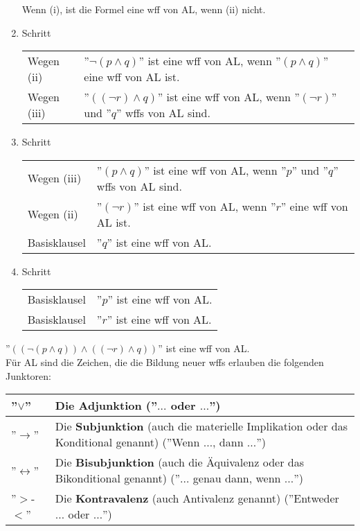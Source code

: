 \documentclass{scrartcl}
\begin{document}
\begin{enumerate}
	Wenn (i), ist die Formel eine wff von AL, wenn (ii) nicht.
	\item Schritt \\
	\begin{tabularx}{\linewidth}{l X}
		Wegen (ii) & ''$ \neg (p \wedge q) $'' ist eine wff von AL, wenn ''$ (p \wedge q) $'' eine wff von AL ist. \\
		Wegen (iii) & ''$ ((\neg r) \wedge q) $'' ist eine wff von AL, wenn ''$ (\neg r) $'' und ''$ q $'' wffs von AL sind.
	\end{tabularx}
	\item Schritt \\
	\begin{tabularx}{\linewidth}{l X}
		Wegen (iii) & ''$ (p \wedge q) $'' ist eine wff von AL, wenn ''$ p $'' und ''$ q $'' wffs von AL sind. \\
		Wegen (ii) & ''$ (\neg r) $'' ist eine wff von AL, wenn ''$ r $'' eine wff von AL ist. \\
		Basisklausel & ''$ q $'' ist eine wff von AL.
	\end{tabularx}
	\item Schritt \\
	\begin{tabularx}{\linewidth}{l X}
		Basisklausel & ''$ p $'' ist eine wff von AL. \\
		Basisklausel & ''$ r $'' ist eine wff von AL.
	\end{tabularx}
\end{enumerate}

''$ ((\neg (p \wedge q)) \wedge ((\neg r) \wedge q)) $'' ist eine wff von AL. \\

Für AL sind die Zeichen, die die Bildung neuer wffs erlauben die folgenden Junktoren: \\

\begin{tabularx}{\linewidth}{l X}
	''$ \vee $'' & Die \textbf{Adjunktion} (''$ \ldots $ oder $ \ldots $'') \\
	\hline
	''$ \rightarrow $'' & Die \textbf{Subjunktion} (auch die materielle Implikation oder das Konditional genannt) (''Wenn $ \ldots $, dann $ \ldots $'') \\
	\hline
	''$ \leftrightarrow $'' & Die \textbf{Bisubjunktion} (auch die Äquivalenz oder das Bikonditional genannt) (''$ \ldots $ genau dann, wenn $ \ldots $'') \\
	\hline
	''$ > $-$ < $'' & Die \textbf{Kontravalenz} (auch Antivalenz genannt) (''Entweder $ \ldots $ oder $ \ldots $'')
\end{tabularx} \\
\end{document}
